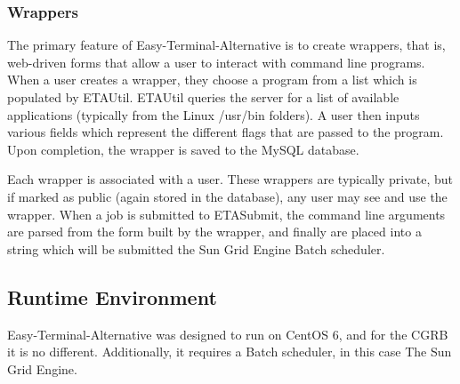 \documentclass[a4paper,12pt]{article}
\begin{document}
\subsubsection{Wrappers}
 The primary feature of Easy-Terminal-Alternative is to create wrappers, that is, web-driven forms that allow a user to interact with command line programs. When a user creates a wrapper, they choose a program from a list which is populated by ETAUtil. ETAUtil queries the server for a list of available applications (typically from the Linux /usr/bin folders). A user then inputs various fields which represent the different flags that are passed to the program. Upon completion, the wrapper is saved to the MySQL database.

 Each wrapper is associated with a user. These wrappers are typically private, but if marked as public (again stored in the database), any user may see and use the wrapper. When a job is submitted to ETASubmit, the command line arguments are parsed from the form built by the wrapper, and finally are placed into a string which will be submitted the Sun Grid Engine Batch scheduler.

\subsection{Runtime Environment}
Easy-Terminal-Alternative was designed to run on CentOS 6, and for the CGRB it is no different. Additionally, it requires a Batch scheduler, in this case The Sun Grid Engine. 


\setlength{\parindent}{0.5in}
\end{document}
